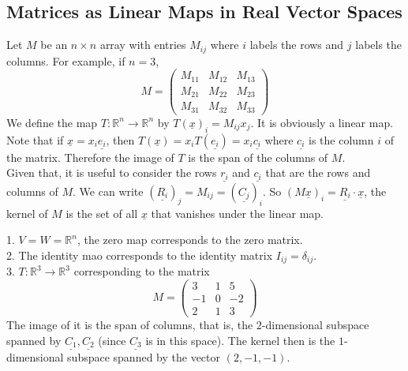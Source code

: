 \subsection{Matrices as Linear Maps in Real Vector Spaces}
Let $M$ be an $n\times n$ array with entries $M_{ij}$ where $i$ labels the rows and $j$ labels the columns.
For example, if $n=3$,
$$
M=
\begin{pmatrix}
    M_{11}&M_{12}&M_{13}\\
    M_{21}&M_{22}&M_{23}\\
    M_{31}&M_{32}&M_{33}
\end{pmatrix}
$$
We define the map $T:\mathbb R^n\to\mathbb R^n$ by $T(\underline{x})_i=M_{ij}x_j$.
It is obviously a linear map.
Note that if $\underline{x}=x_i\underline{e_i}$, then $T(\underline{x})=x_iT(\underline{e_i})=x_i\underline{c_i}$ where $\underline{c_i}$ is the column $i$ of the matrix.
Therefore the image of $T$ is the span of the columns of $M$.\\
Given that, it is useful to consider the rows $\underline{r_i}$ and $\underline{c_i}$ that are the rows and columns of $M$.
We can write $(\underline{R_i})_j=M_{ij}=(\underline{C_j})_i$.
So $(M\underline{x})_i=\underline{R_i}\cdot\underline{x}$, the kernel of $M$ is the set of all $\underline{x}$ that vanishes under the linear map.
\begin{example}
    1. $V=W=\mathbb R^n$, the zero map corresponds to the zero matrix.\\
    2. The identity mao corresponds to the identity matrix $I_{ij}=\delta_{ij}$.\\
    3. $T:\mathbb R^3\to\mathbb R^3$ corresponding to the matrix
    $$M=\begin{pmatrix}
        3&1&5\\
        -1&0&-2\\
        2&1&3
    \end{pmatrix}$$
    The image of it is the span of columns, that is, the $2$-dimensional subspace spanned by $\underline{C_1},\underline{C_2}$ (since $\underline{C_3}$ is in this space).
    The kernel then is the $1$-dimensional subspace spanned by the vector $(2,-1,-1)$.
\end{example}
